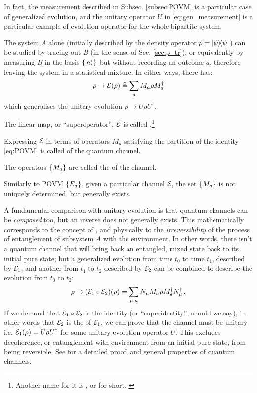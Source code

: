 In fact, the measurement described in Subsec. \ref{subsec:POVM}
is a particular case of generalized evolution, and the unitary operator $U$
in \eqref{eq:gen_measurement} is a particular example of
evolution operator for the whole bipartite system.

The system $A$ alone
(initially described by the density operator $\rho=\ketbra{\psi}$)
can be studied by tracing out $B$
(in the sense of Sec. \ref{sec:p_tr}),
or equivalently by measuring $B$ in the basis $\left\{\ket{a}\right\}$
but without recording an outcome $a$, therefore leaving the system
in a statistical mixture.
In either ways, there has:
\begin{equation}\label{eq:channel}
  \rho \rightarrow \mathcal{E}(\rho) \triangleq \sum_a M_a \rho M_a^{\dagger}
\end{equation}
which generalises the unitary evolution $\rho \rightarrow U \rho U^{\dagger}$.

The linear map, or ``superoperator'', $\mathcal{E}$
is called .\footnote{
  Another name for it is
  ,
  or  for short. \parencite[Sec. 3.2]{PreskillNotes}
}

Expressing $\mathcal{E}$ in terms of operators $M_a$
satisfying the partition of the identity \eqref{eq:POVM}
is called
 of the quantum channel.

The operators $\left\{M_a\right\}$ are called the 
of the channel.

Similarly to POVM $\left\{E_a\right\}$, given a particular channel $\mathcal{E}$,
the set $\left\{M_a\right\}$ is not uniquely determined, but
generally exists.

A fundamental comparison with unitary evolution is that
quantum channels can be \emph{composed} too, but an inverse
does not generally exists.
This mathematically corresponds to the concept of ,
and physically to the \emph{irreversibility} of the process
of entanglement of subsystem $A$ with the environment. In other words,
there isn't a quantum channel that will bring back an entangled,
mixed state back to its initial pure state;
but a generalized evolution from time $t_0$ to time $t_1$,
described by $\mathcal{E}_1$,
and another from $t_1$ to $t_2$ described by $\mathcal{E}_2$
can be combined to describe the evolution from $t_0$ to $t_2$:
\[
  \rho \rightarrow \qty(\mathcal{E}_1 \circ \mathcal{E}_2) (\rho) =
  \sum_{\mu,a} N_{\mu} M_a \rho M_a^{\dagger} N_{\mu}^{\dagger}
  \,\text{.}
\]
If we demand that $\mathcal{E}_1 \circ \mathcal{E}_2$
is the identity (or ``superidentity'', should we say),
in other words that $\mathcal{E}_2$
is the  of $\mathcal{E}_1$,
we can prove that the channel must be unitary i.e.
$\mathcal{E}_1(\rho) = U \rho U^{\dagger}$
for some unitary evolution operator $U$.
This excludes decoherence,
or entanglement with environment from an initial pure state,
from being reversible.
See \cite[Sec. 3.2]{PreskillNotes} for a detailed proof,
and general properties of quantum channels.

